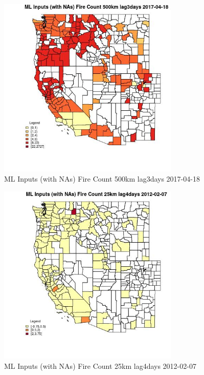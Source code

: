\begin{figure} 
\centering  
\includegraphics[width=0.77\textwidth]{Code_Outputs/Report_ML_input_PM25_Step4_part_f_de_duplicated_aves_prioritize_24hr_obswNAs_CountyFire_Count_500km_lag3daysMean2017-04-18.jpg} 
\caption{\label{fig:Report_ML_input_PM25_Step4_part_f_de_duplicated_aves_prioritize_24hr_obswNAsCountyFire_Count_500km_lag3daysMean2017-04-18}ML Inputs (with NAs) Fire Count 500km lag3days 2017-04-18} 
\end{figure} 
 

\begin{figure} 
\centering  
\includegraphics[width=0.77\textwidth]{Code_Outputs/Report_ML_input_PM25_Step4_part_f_de_duplicated_aves_prioritize_24hr_obswNAs_CountyFire_Count_25km_lag4daysMean2012-02-07.jpg} 
\caption{\label{fig:Report_ML_input_PM25_Step4_part_f_de_duplicated_aves_prioritize_24hr_obswNAsCountyFire_Count_25km_lag4daysMean2012-02-07}ML Inputs (with NAs) Fire Count 25km lag4days 2012-02-07} 
\end{figure} 
 

